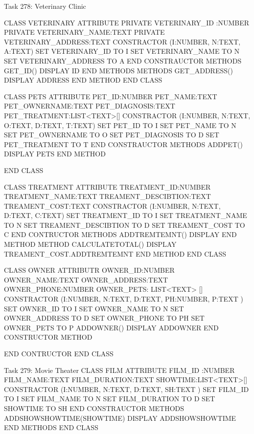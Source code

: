 Task 278: Veterinary Clinic 

   CLASS VETERINARY 
      ATTRIBUTE 
       PRIVATE VETERINARY_ID :NUMBER
       PRIVATE VETERINARY_NAME:TEXT
       PRIVATE VETERINARY_ADDRESS:TEXT
	   CONSTRACTOR (I:NUMBER, N:TEXT, A:TEXT)
	    SET  VETERINARY_ID TO I
	    SET VETERINARY_NAME TO N
	    SET VETERINARY_ADDRESS TO A
	   END CONSTRAUCTOR   
      METHODS
	   GET_ID()
	     DISPLAY ID
	  END METHODS
	  METHODS 
	    GET_ADDRESS()
		  DISPLAY ADDRESS
	  END METHOD    
   END CLASS 
    
   CLASS PETS 
      ATTRIBUTE
       PET_ID:NUMBER
       PET_NAME:TEXT
       PET_OWNERNAME:TEXT
       PET_DIAGNOSIS:TEXT
       PET_TREATMENT:LIST<TEXT>[]
	   CONSTRACTOR (I:NUMBER, N:TEXT, O:TEXT, D:TEXT, T:TEXT)
	    SET  PET_ID TO I
	    SET PET_NAME TO N
	    SET PET_OWNERNAME TO O 
	    SET PET_DIAGNOSIS TO D
		SET PET_TREATMENT TO T
	 END CONSTRAUCTOR  
	   METHODS 
	   ADDPET()
	    DISPLAY PETS 
	   END METHOD 
	   
     END CLASS 

    CLASS TREATMENT
      ATTRIBUTE
       TREATMENT_ID:NUMBER
       TREATMENT_NAME:TEXT
       TREAMENT_DESCIBTION:TEXT
       TREAMENT_COST:TEXT
	   CONSTRACTOR (I:NUMBER, N:TEXT, D:TEXT, C:TEXT)
	    SET  TREATMENT_ID TO I
	    SET TREATMENT_NAME TO N
	    SET TREAMENT_DESCIBTION TO D
	    SET TREAMENT_COST TO C
	  END CONTRUCTOR 
	METHODS 
		 ADDTREMTEMNT()
		   DISPLAY 
		END METHOD
    METHOD 
       CALCULATETOTAL()
         DISPLAY TREAMENT_COST.ADDTREMTEMNT
    END METHOD 		 
     END CLASS 
      
     CLASS OWNER
      ATTRIBUTR 
       OWNER_ID:NUMBER 
       OWNER_NAME:TEXT
       OWNER_ADDRESS:TEXT 
       OWNER_PHONE:NUMBER
       OWNER_PETS: LIST<TEXT> [] 
     CONSTRACTOR (I:NUMBER, N:TEXT, D:TEXT, PH:NUMBER, P:TEXT )
	    SET  OWNER_ID TO I
	    SET OWNER_NAME TO N
	    SET  OWNER_ADDRESS TO D
	    SET OWNER_PHONE TO PH
		SET  OWNER_PETS TO P
		ADDOWNER()
		  DISPLAY ADDOWNER
	 END CONSTRUCTOR 
	 METHOD 
		
	  END CONTRUCTOR 
	  END CLASS 
    
Task 279: Movie Theater
 CLASS FILM 
      ATTRIBUTE 
       FILM_ID :NUMBER
       FILM_NAME:TEXT
       FILM_DURATION:TEXT 
	   SHOWTIME:LIST<TEXT>[]
	   CONSTRACTOR (I:NUMBER, N:TEXT, D:TEXT, SH:TEXT )
	    SET  FILM_ID TO I
	    SET FILM_NAME TO N
	    SET FILM_DURATION TO D
	    SET SHOWTIME TO SH
	   END CONSTRAUCTOR   
      METHODS
	   ADDSHOWSHOWTIME(SHOWTIME)
	     DISPLAY ADDSHOWSHOWTIME
	  END METHODS
   END CLASS 
   
